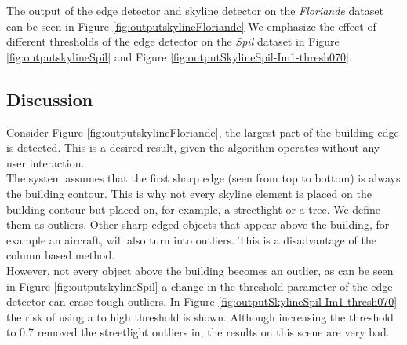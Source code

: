 The output of the edge detector and skyline detector on the \emph{Floriande}
dataset \cite{Fit3d} can be seen in Figure \ref{fig:outputskylineFloriande}
We emphasize the effect of different thresholds of the edge detector on the
\emph{Spil} dataset in Figure \ref{fig:outputskylineSpil} and Figure
\ref{fig:outputSkylineSpil-Im1-thresh070}.

\pagebreak
{}

\clearpage
{}
\clearpage

\clearpage

\subsection{Discussion}  %
Consider Figure \ref{fig:outputskylineFloriande}, the largest part of the
building edge is detected. This is a desired result, given the algorithm
operates without any user interaction.\\
The system assumes that the first sharp edge (seen from top to bottom) is always
the building contour. This is why not every skyline element is placed on the building
contour but placed on, for example, a streetlight or a tree. We define them
as outliers. Other sharp edged objects that appear above the building,
for example an aircraft, will also turn into outliers.  This is a disadvantage of the
	column based method.\\
However, not every object above the building becomes an outlier, as can be seen in Figure
\ref{fig:outputskylineSpil} a change in the threshold parameter of the edge
detector can erase tough outliers. 
In Figure \ref{fig:outputSkylineSpil-Im1-thresh070} the risk of using a to high
threshold is shown. Although increasing the threshold to 0.7 removed the
streetlight outliers in, the results on this scene are very bad.\\

